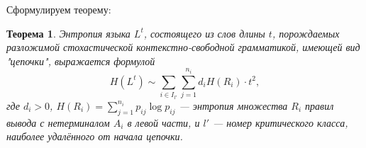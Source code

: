 \documentclass[12pt]{article}
\newtheorem{theorem}{Теорема}
\begin{document}
Сформулируем теорему:
\begin{theorem}
	Энтропия языка $L^t$, состоящего из слов длины $t$, порождаемых разложимой стохастической контекстно-свободной грамматикой, имеющей вид "цепочки", выражается формулой
	\begin{equation}
		H(L^t) \sim \sum_{i \in I_{l'}} \sum_{j = 1}^{n_i} d_i H(R_i) \cdot t^2,
	\end{equation}
	где $d_i > 0$, $H(R_i) = \sum_{j = 1}^{n_i} p_{ij} \log p_{ij}$ --- энтропия множества $R_i$ правил вывода с нетерминалом $A_i$ в левой части, и $l'$ --- номер критического класса, наиболее удалённого от начала цепочки.
\end{theorem}
\end{document}
